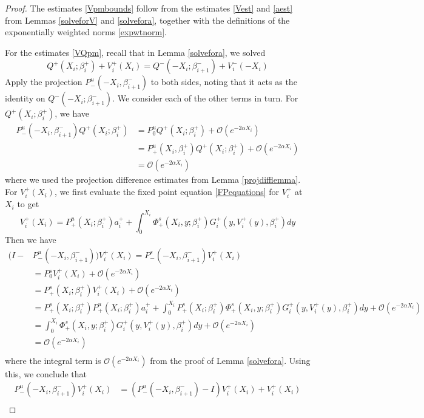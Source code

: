 \documentclass[thesis.tex]{subfiles}
\begin{document}
\begin{lemma}
\begin{proof}
The estimates \eqref{Vpmbounds} follow from the estimates \eqref{Vest} and \eqref{aest} from Lemmas \ref{solveforV} and \ref{solvefora}, together with the definitions of the exponentially weighted norms \eqref{expwtnorm}.

For the estimates \eqref{VQpm}, recall that in Lemma \ref{solvefora}, we solved
\[
Q^+(X_i; \beta_i^+) + V_i^+(X_i) = Q^-(-X_i; \beta_{i+1}^-) + V_i^-(-X_i)
\]
Apply the projection $P^u_-(-X_i, \beta_{i+1}^-)$ to both sides, noting that it acts as the identity on $Q^-(-X_i; \beta_{i+1}^-)$. We consider each of the other terms in turn. For $Q^+(X_i; \beta_i^+)$, we have
\begin{align*}
P^u_-(-X_i, \beta_{i+1}^-) Q^+(X_i; \beta_i^+)
&= P^u_0 Q^+(X_i; \beta_i^+) + \mathcal{O}(e^{-2 \alpha X_i}) \\
&= P^u_+(X_i, \beta_i^+) Q^+(X_i; \beta_i^+) + \mathcal{O}(e^{-2 \alpha X_i}) \\
&= \mathcal{O}(e^{-2 \alpha X_i})
\end{align*}
where we used the projection difference estimates from Lemma \ref{projdifflemma}. For $V_i^+(X_i)$, we first evaluate the fixed point equation \eqref{FPequations} for $V_i^+$ at $X_i$ to get
\[
V_i^+(X_i) = P^u_+(X_i; \beta_i^+) a_i^+ 
+ \int_0^{X_i} \Phi_+^s(X_i, y; \beta_i^+) G_i^+(y, V_i^+(y),\beta_i^+)dy
\]
Then we have
\begin{align*}
(I - &P^u_-(-X_i, \beta_{i+1}^-)) V_i^+(X_i) = 
P^s_-(-X_i, \beta_{i+1}^-) V_i^+(X_i) \\
&= P_0^s V_i^+(X_i) + \mathcal{O}(e^{-2 \alpha X_i}) \\
&= P^s_+(X_i; \beta_i^+) V_i^+(X_i) + \mathcal{O}(e^{-2 \alpha X_i}) \\
&= P^s_+(X_i; \beta_i^+) P^u_+(X_i; \beta_i^+) a_i^+ 
+ \int_0^{X_i} P^s_+(X_i; \beta_i^+) \Phi_+^s(X_i, y; \beta_i^+) G_i^+(y, V_i^+(y),\beta_i^+)dy + \mathcal{O}(e^{-2 \alpha X_i}) \\
&= \int_0^{X_i} \Phi_+^s(X_i, y; \beta_i^+) G_i^+(y, V_i^+(y),\beta_i^+)dy + \mathcal{O}(e^{-2 \alpha X_i}) \\
&= \mathcal{O}(e^{-2 \alpha X_i}) \\
\end{align*}
where the integral term is $\mathcal{O}(e^{-2 \alpha X_i})$ from the proof of Lemma \ref{solvefora}. Using this, we conclude that
\begin{align*}
P^u_-(-X_i, \beta_{i+1}^-) V_i^+(X_i) &= 
(P^u_-(-X_i, \beta_{i+1}^-) - I)V_i^+(X_i) + V_i^+(X_i) \\

\end{align*}
\end{proof}
\end{lemma}
\end{document}
